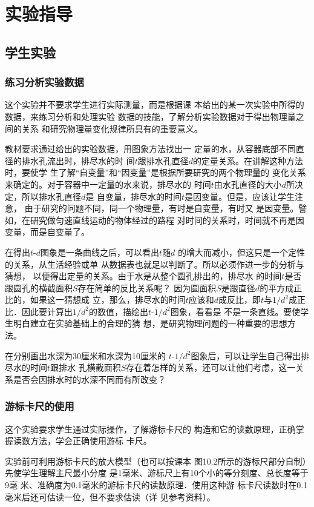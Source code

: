 \section{实验指导}
\subsection{学生实验}
\subsubsection{练习分析实验数据}
这个实验并不要求学生进行实际测量，而是根据课
本给出的某一次实验中所得的数据，来练习分析和处理实验
数据的技能，了解分析实验数据对于得出物理量之间的关系
和研究物理量变化规律所具有的重要意义。

教材要求通过给出的实验数据，用图象方法找出一
定量的水，从容器底部不同直径的排水孔流出时，排尽水的时
间$t$跟排水孔直径$d$的定量关系。在讲解这种方法时，要使学
生了解“自变量”和“因变量”是根据所要研究的两个物理量的
变化关系来确定的。对于容器中一定量的水来说，排尽水的
时间$t$由水孔直径的大小$d$所决定，所以排水孔直径$d$是
自变量，排尽水的时间$t$是因变量。但是，应该让学生注意，
由于研究的问题不同，同一个物理量，有时是自变量，有时又
是因变量。譬如，在研究做匀速直线运动的物体经过的路程
对时间的关系时，时间就不再是因变量，而是自变量了。

在得出$t$-$d$图象是一条曲线之后，可以看出$t$随$d$
的增大而减小，但这只是一个定性的关系，从生活经验或单
从数据表也就足以判断了。所以必须作进一步的分析与猜想，
以便得出定量的关系。由于水是从整个圆孔排出的，排尽水
的时间$t$是否跟圆孔的横截面积$S$存在简单的反比关系呢？
因为圆面积$S$是跟直径$d$的平方成正比的，如果这一猜想成
立，那么，排尽水的时间$t$应该和$d$成反比，即$t$与$1/d^2$成正
比．因此要计算出$1/d^2$的数值，描绘出$t$-$1/d^2$图象，看看是
不是一条直线。要使学生明白建立在实验基础上的合理的猜
想，是研究物理问题的一种重要的思想方法。

在分别画出水深为30厘米和水深为10厘米的
$t$-$1/d^2$图象后，可以让学生自己得出排尽水的时间$t$跟排水
孔横截面积$S$存在着怎样的关系，还可以让他们考虑，这一关
系是否会因排水时的水深不同而有所改变？

\subsubsection{游标卡尺的使用}

这个实验要求学生通过实际操作，了解游标卡尺的
构造和它的读数原理，正确掌握读数方法，学会正确使用游标
卡尺。

实验前可利用游标卡尺的放大模型（也可以按课本
图10.2所示的游标尺部分自制）先使学生理解主尺最小分度
是1毫米、游标尺上有10个小的等分刻度、总长度等于9毫
米、准确度为0.1毫米的游标卡尺的读数原理．使用这种游
标卡尺读数时在0.1毫米后还可估读一位，但不要求估读（详
见参考资料）。

